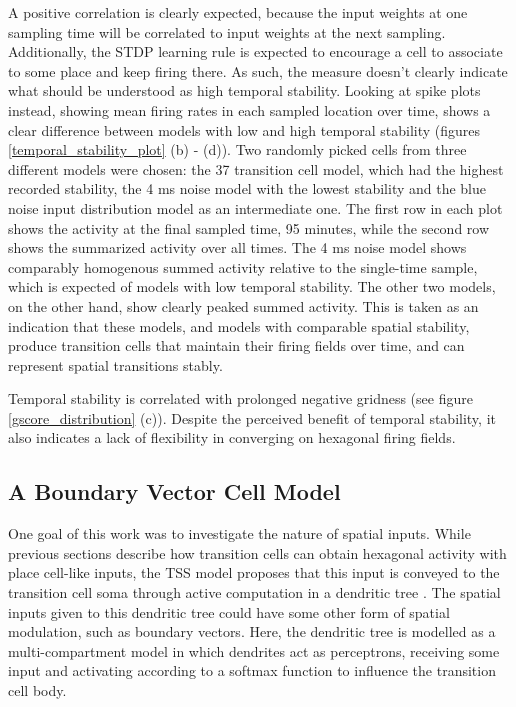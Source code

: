 \documentclass{article}
\begin{document}
    A positive correlation is clearly expected, because the input weights at one sampling time will be correlated to input weights at the next sampling. Additionally, the STDP learning rule is expected to encourage a cell to associate to some place and keep firing there. As such, the measure doesn't clearly indicate what should be understood as high temporal stability. Looking at spike plots instead, showing mean firing rates in each sampled location over time, shows a clear difference between models with low and high temporal stability (figures \ref{temporal_stability_plot} (b) - (d)). Two randomly picked cells from three different models were chosen: the 37 transition cell model, which had the highest recorded stability, the 4 ms noise model with the lowest stability and the blue noise input distribution model as an intermediate one. The first row in each plot shows the activity at the final sampled time, 95 minutes, while the second row shows the summarized activity over all times. The 4 ms noise model shows comparably homogenous summed activity relative to the single-time sample, which is expected of models with low temporal stability. The other two models, on the other hand, show clearly peaked summed activity. This is taken as an indication that these models, and models with comparable spatial stability, produce transition cells that maintain their firing fields over time, and can represent spatial transitions stably.

    Temporal stability is correlated with prolonged negative gridness (see figure \ref{gscore_distribution} (c)). Despite the perceived benefit of temporal stability, it also indicates a lack of flexibility in converging on hexagonal firing fields.

    \subsection{A Boundary Vector Cell Model} \label{MCModResult}
    One goal of this work was to investigate the nature of spatial inputs. While previous sections describe how transition cells can obtain hexagonal activity with place cell-like inputs, the TSS model proposes that this input is conveyed to the transition cell soma through active computation in a dendritic tree \parencite{Waniek2020}. The spatial inputs given to this dendritic tree could have some other form of spatial modulation, such as boundary vectors. Here, the dendritic tree is modelled as a multi-compartment model in which dendrites act as perceptrons, receiving some input and activating according to a softmax function to influence the transition cell body.
\end{document}
